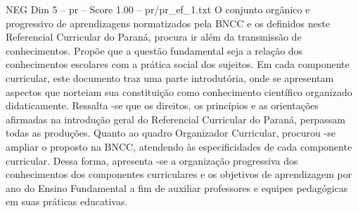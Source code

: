 \begin{textsample}{NEG Dim 5 – pr – Score 1.00 – pr/pr\_ef\_1.txt}
O conjunto orgânico e progressivo de aprendizagens normatizados pela BNCC e os definidos neste Referencial Curricular do Paraná, procura ir além da transmissão de conhecimentos.
Propõe que a questão fundamental seja a relação dos conhecimentos escolares com a prática social dos sujeitos.
Em cada componente curricular, este documento traz uma parte introdutória, onde se apresentam aspectos que norteiam sua constituição como conhecimento científico organizado didaticamente.
Ressalta -se que os direitos, os princípios e as orientações afirmadas na introdução geral do Referencial Curricular do Paraná, perpassam todas as produções.
Quanto ao quadro Organizador Curricular, procurou -se ampliar o proposto na BNCC, atendendo às especificidades de cada componente curricular.
Dessa forma, apresenta -se a organização progressiva dos conhecimentos dos componentes curriculares e os objetivos de aprendizagem por ano do Ensino Fundamental a fim de auxiliar professores e equipes pedagógicas em suas práticas educativas.

\end{textsample}
